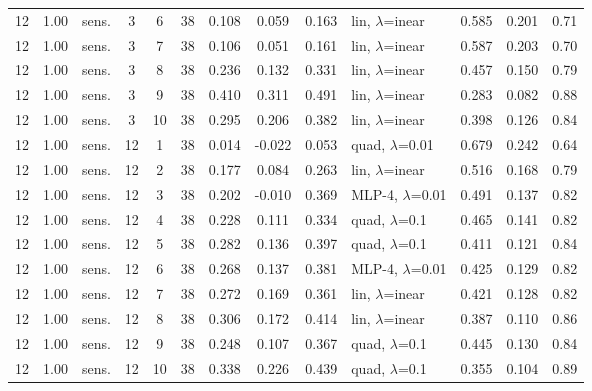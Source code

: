 \documentclass[10pt]{article}
\begin{document}
\begin{scriptsize}
\begin{longtable}{cclcc c ccc l ccc}
12 & 1.00 & sens. & 3 & 6 & 38 & 0.108 & 0.059 & 0.163 & lin, $\lambda$=inear & 0.585 & 0.201 & 0.71 \\
12 & 1.00 & sens. & 3 & 7 & 38 & 0.106 & 0.051 & 0.161 & lin, $\lambda$=inear & 0.587 & 0.203 & 0.70 \\
12 & 1.00 & sens. & 3 & 8 & 38 & 0.236 & 0.132 & 0.331 & lin, $\lambda$=inear & 0.457 & 0.150 & 0.79 \\
12 & 1.00 & sens. & 3 & 9 & 38 & 0.410 & 0.311 & 0.491 & lin, $\lambda$=inear & 0.283 & 0.082 & 0.88 \\
12 & 1.00 & sens. & 3 & 10 & 38 & 0.295 & 0.206 & 0.382 & lin, $\lambda$=inear & 0.398 & 0.126 & 0.84 \\
12 & 1.00 & sens. & 12 & 1 & 38 & 0.014 & -0.022 & 0.053 & quad, $\lambda$=0.01 & 0.679 & 0.242 & 0.64 \\
12 & 1.00 & sens. & 12 & 2 & 38 & 0.177 & 0.084 & 0.263 & lin, $\lambda$=inear & 0.516 & 0.168 & 0.79 \\
12 & 1.00 & sens. & 12 & 3 & 38 & 0.202 & -0.010 & 0.369 & MLP-4, $\lambda$=0.01 & 0.491 & 0.137 & 0.82 \\
12 & 1.00 & sens. & 12 & 4 & 38 & 0.228 & 0.111 & 0.334 & quad, $\lambda$=0.1 & 0.465 & 0.141 & 0.82 \\
12 & 1.00 & sens. & 12 & 5 & 38 & 0.282 & 0.136 & 0.397 & quad, $\lambda$=0.1 & 0.411 & 0.121 & 0.84 \\
12 & 1.00 & sens. & 12 & 6 & 38 & 0.268 & 0.137 & 0.381 & MLP-4, $\lambda$=0.01 & 0.425 & 0.129 & 0.82 \\
12 & 1.00 & sens. & 12 & 7 & 38 & 0.272 & 0.169 & 0.361 & lin, $\lambda$=inear & 0.421 & 0.128 & 0.82 \\
12 & 1.00 & sens. & 12 & 8 & 38 & 0.306 & 0.172 & 0.414 & lin, $\lambda$=inear & 0.387 & 0.110 & 0.86 \\
12 & 1.00 & sens. & 12 & 9 & 38 & 0.248 & 0.107 & 0.367 & quad, $\lambda$=0.1 & 0.445 & 0.130 & 0.84 \\
12 & 1.00 & sens. & 12 & 10 & 38 & 0.338 & 0.226 & 0.439 & quad, $\lambda$=0.1 & 0.355 & 0.104 & 0.89 \\
\end{longtable}
\end{scriptsize}
\end{document}
